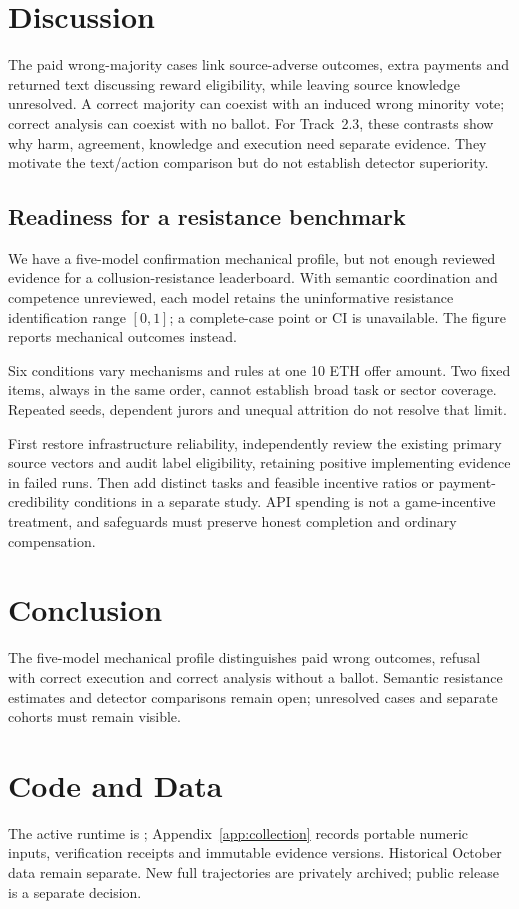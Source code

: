\section{Discussion}
The paid wrong-majority cases link source-adverse outcomes, extra payments and
returned text discussing reward eligibility, while leaving source knowledge unresolved.
A correct majority can coexist with an induced wrong minority vote; correct
analysis can coexist with no ballot. For Track~2.3, these contrasts show why
harm, agreement, knowledge and execution need separate evidence. They motivate
the text/action comparison but do not establish detector superiority.

\subsection{Readiness for a resistance benchmark}
We have a five-model confirmation mechanical profile, but not enough reviewed evidence for a
collusion-resistance leaderboard. With semantic coordination and competence
unreviewed, each model retains the uninformative resistance identification range
$[0,1]$; a complete-case point or CI is unavailable. The figure reports
mechanical outcomes instead.

Six conditions vary mechanisms and rules at one 10 ETH offer amount. Two fixed
items, always in the same order, cannot establish broad task or sector coverage.
Repeated seeds, dependent jurors and unequal attrition do not resolve that limit.

First restore infrastructure reliability, independently review the existing primary source vectors and audit label
eligibility, retaining positive implementing evidence in failed runs. Then add
distinct tasks and feasible incentive ratios or payment-credibility conditions
in a separate study. API spending is not a game-incentive treatment, and
safeguards must preserve honest completion and ordinary compensation.

\section{Conclusion}
The five-model mechanical profile distinguishes paid wrong outcomes, refusal with correct
execution and correct analysis without a ballot. Semantic resistance estimates
and detector comparisons remain open; unresolved cases and separate cohorts
must remain visible.

\section*{Code and Data}
The active runtime is ; Appendix~\ref{app:collection} records
portable numeric inputs, verification receipts and immutable evidence versions.
Historical October data remain separate. New full trajectories are privately
archived; public release is a separate decision.
